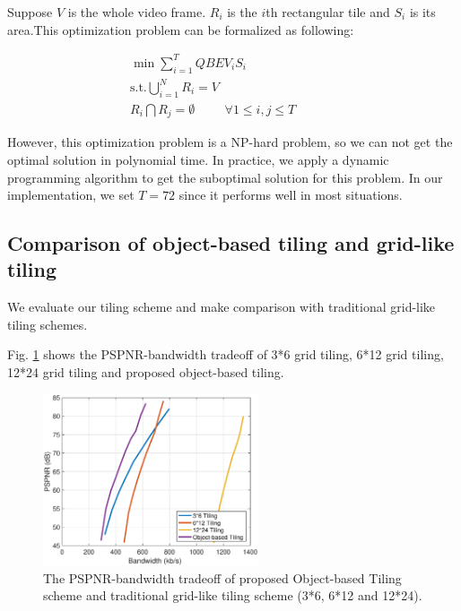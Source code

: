 Suppose $V$ is the whole video frame. $R_i$ is the $i$th rectangular tile and $S_i$ is its area.This optimization problem can be formalized as following:

\begin{equation}
\begin{aligned}
\min \sum_{i = 1}^T QBEV_{i} S_i \hspace{3cm} \\
\text{s.t.} \bigcup _{i=1}^N R_{i} = V\hspace{3cm} \\
R_i \bigcap R_j = \emptyset \hspace{1cm} \forall 1 \le i, j \le T
\end{aligned}
\end{equation}

However, this optimization problem is a NP-hard problem, so we can not get the optimal solution in polynomial time. In practice, we apply a dynamic programming algorithm to get the suboptimal solution for this problem. In our implementation, we set $T = 72$ since it performs well in most situations.

\subsection{Comparison of object-based tiling and grid-like tiling}

We evaluate our tiling scheme and make comparison with traditional grid-like tiling schemes.

Fig. \ref{tiling} shows the PSPNR-bandwidth tradeoff of 3*6 grid tiling, 6*12 grid tiling, 12*24 grid tiling and proposed object-based tiling. 

  \begin{figure}
  \centering
  \includegraphics[width=2.5in]{images/tiling.eps}
  \caption{The PSPNR-bandwidth tradeoff of proposed Object-based Tiling scheme and traditional grid-like tiling scheme (3*6, 6*12 and 12*24).}
  \label{tiling}
  \end{figure}

